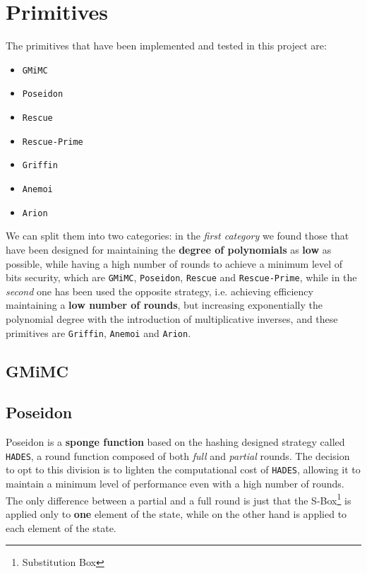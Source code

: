 \documentclass[12pt, a4paper]{report}
\begin{document}
\section{Primitives}\label{sec:primitives}

The primitives that have been implemented and tested in this project are:
\begin{itemize}
  \item \texttt{GMiMC}
  \item \texttt{Poseidon}
  \item \texttt{Rescue}
  \item \texttt{Rescue-Prime}
  \item \texttt{Griffin}
  \item \texttt{Anemoi}
  \item \texttt{Arion}
\end{itemize}

We can split them into two categories: in the \textit{first category} we found those that have been designed for maintaining the \textbf{degree of polynomials} as \textbf{low} as possible, while having a high number of rounds to achieve a minimum level of bits security, which are \texttt{GMiMC}, \texttt{Poseidon}, \texttt{Rescue} and \texttt{Rescue-Prime}, while in the \textit{second} one has been used the opposite strategy, i.e. achieving efficiency maintaining a \textbf{low number of rounds}, but increasing exponentially the polynomial degree with the introduction of multiplicative inverses, and these primitives are \texttt{Griffin}, \texttt{Anemoi} and \texttt{Arion}.

\subsection{GMiMC}\label{subsec:gmimc}

\subsection{Poseidon}\label{subsec:poseidon}

Poseidon is a \textbf{sponge function} based on the hashing designed strategy called \texttt{HADES}, a round function composed of both \textit{full} and \textit{partial} rounds.
The decision to opt to this division is to lighten the computational cost of \texttt{HADES}, allowing it to maintain a minimum level of performance even with a high number of rounds. The only difference between a partial and a full round is just that the S-Box\footnote{Substitution Box} is applied only to \textbf{one} element of the state, while on the other hand is applied to each element of the state.
\end{document}
